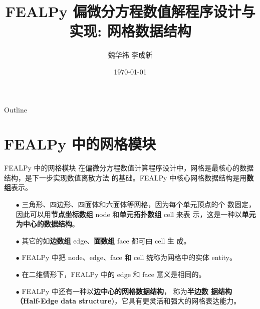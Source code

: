 \documentclass{beamer}
\title{FEALPy 偏微分方程数值解程序设计与实现: {\bf 网格数据结构}}
\author{魏华祎 \quad 李成新}
\institute[XTU]{
weihuayi@xtu.edu.cn\\
\vspace{5pt}
湘潭大学$\bullet$数学与计算科学学院\\
}
\date[XTU]
{
    \today
}
\numberwithin{subsection}{section}
\begin{document}
\begin{frame}
  \titlepage
\end{frame}

\begin{frame}{Outline}
  \tableofcontents
\end{frame}


\section{FEALPy 中的网格模块}

\begin{frame}[fragile]{FEALPy 中的网格模块}
    在偏微分方程数值计算程序设计中，网格是最核心的数据结构，是下一步实现数值离散方法
    的基础。FEALPy 中核心网格数据结构是用{\bf 数组}表示。
\begin{itemize}
    \item[$\bullet$] 三角形、四边形、四面体和六面体等网格，因为每个单元顶点的个
        数固定，因此可以用{\bf 节点坐标数组} node 和{\bf 单元拓扑数组} cell 来表
        示，这是一种以{\bf 单元为中心的数据结构}。
    \item[$\bullet$] 其它的如{\bf 边数组} edge、{\bf 面数组} face 都可由 cell 生
        成。
    \item[$\bullet$] FEALPy 中把 node、edge、face 和 cell 统称为网格中的实体 entity。
    \item[$\bullet$] 在二维情形下，FEALPy 中的 edge 和 face 意义是相同的。
    \item[$\bullet$] FEALPy 中还有一种以{\bf 边中心的网格数据结构}， 称为{\bf 半边数
    据结构（Half-Edge data structure)}，它具有更灵活和强大的网格表达能力。
\end{itemize}
\end{frame}
\end{document}
